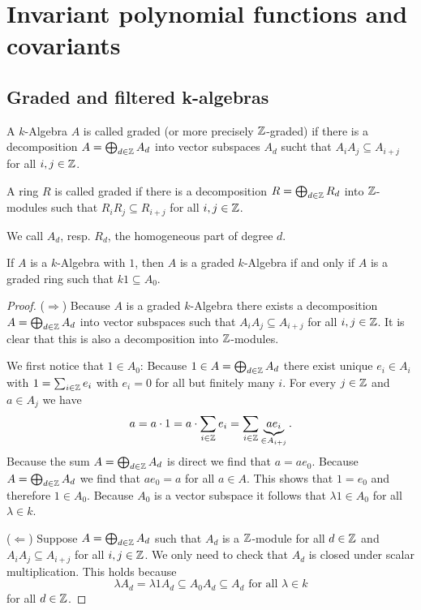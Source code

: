 \chapter{Invariant polynomial functions and covariants}





\section{Graded and filtered k-algebras}


\begin{defi}
 A $k$-Algebra $A$ is called graded (or more precisely $\mathbb{Z}$-graded) if there is a decomposition $A = \bigoplus_{d \in \mathbb{Z}} A_d$ into vector subspaces $A_d$ sucht that $A_i A_j \subseteq A_{i+j}$ for all $i,j \in \mathbb{Z}$.
 
 A ring $R$ is called graded if there is a decomposition $R = \bigoplus_{d \in \mathbb{Z}} R_d$ into $\mathbb{Z}$-modules such that $R_i R_j \subseteq R_{i+j}$ for all $i,j \in \mathbb{Z}$.
 
 We call $A_d$, resp. $R_d$, the homogeneous part of degree $d$.
\end{defi}

\begin{rem}
 If $A$ is a $k$-Algebra with $1$, then $A$ is a graded $k$-Algebra if and only if $A$ is a graded ring such that $k1 \subseteq A_0$.
\end{rem}
\begin{proof}
 ($\Rightarrow$) Because $A$ is a graded $k$-Algebra there exists a decomposition $A = \bigoplus_{d \in \mathbb{Z}} A_d$ into vector subspaces such that $A_i A_j \subseteq A_{i+j}$ for all $i,j \in \mathbb{Z}$. It is clear that this is also a decomposition into $\mathbb{Z}$-modules.
 
 We first notice that $1 \in A_0$: Because $1 \in A = \bigoplus_{d \in \mathbb{Z}} A_d$ there exist unique $e_i \in A_i$ with $1 = \sum_{i \in \mathbb{Z}} e_i$ with $e_i = 0$ for all but finitely many $i$. For every $j \in \mathbb{Z}$ and $a \in A_j$ we have
 \[
  a = a \cdot 1 = a \cdot \sum_{i \in \mathbb{Z}} e_i = \sum_{i \in \mathbb{Z}} \underbrace{a e_i}_{\in A_{i+j}}.
 \]
 Because the sum $A = \bigoplus_{d \in \mathbb{Z}} A_d$ is direct we find that $a = a e_0$. Because $A = \bigoplus_{d \in \mathbb{Z}} A_d$ we find that $a e_0 = a$ for all $a \in A$. This shows that $1 = e_0$ and therefore $1 \in A_0$. Because $A_0$ is a vector subspace it follows that $\lambda 1 \in A_0$ for all $\lambda \in k$.
 
 ($\Leftarrow$) Suppose $A = \bigoplus_{d \in \mathbb{Z}} A_d$ such that $A_d$ is a $\mathbb{Z}$-module for all $d \in \mathbb{Z}$ and $A_i A_j \subseteq A_{i+j}$ for all $i,j \in \mathbb{Z}$. We only need to check that $A_d$ is closed under scalar multiplication. This holds because
 \[
  \lambda A_d = \lambda 1 A_d \subseteq A_0 A_d \subseteq A_d \text{ for all } \lambda \in k
 \]
 for all $d \in \mathbb{Z}$.
\end{proof}


